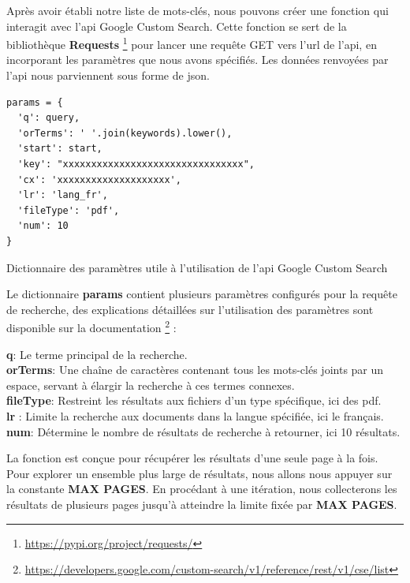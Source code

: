 Après avoir établi notre liste de mots-clés, nous pouvons créer une fonction qui interagit avec l'\ac{api} Google Custom Search. Cette fonction se sert de la bibliothèque \textbf{Requests} \footnote{\href{https://pypi.org/project/requests/}{https://pypi.org/project/requests/}} pour lancer une requête GET vers l'\acs{url} de l'\acs{api}, en incorporant les paramètres que nous avons spécifiés. Les données renvoyées par l'\acs{api} nous parviennent sous forme de \ac{json}.

\begin{listing}[!ht]
\begin{verbatim}
params = {
  'q': query,
  'orTerms': ' '.join(keywords).lower(),
  'start': start,
  'key': "xxxxxxxxxxxxxxxxxxxxxxxxxxxxxxxx",
  'cx': 'xxxxxxxxxxxxxxxxxxxx',
  'lr': 'lang_fr',
  'fileType': 'pdf',
  'num': 10
}
\end{verbatim}
\caption{Dictionnaire des paramètres utile à l'utilisation de l'\acs{api} Google Custom Search}
\label{appendix:code:python:search-google-params}
\end{listing}

Le dictionnaire \textbf{params} contient plusieurs paramètres configurés pour la requête de recherche, des explications détaillées sur l'utilisation des paramètres sont disponible sur la documentation \footnote{\href{https://developers.google.com/custom-search/v1/reference/rest/v1/cse/list}{https://developers.google.com/custom-search/v1/reference/rest/v1/cse/list}} :

\textbf{q}: Le terme principal de la recherche. \\
\textbf{orTerms}: Une chaîne de caractères contenant tous les mots-clés joints par un espace, servant à élargir la recherche à ces termes connexes. \\
\textbf{fileType}: Restreint les résultats aux fichiers d'un type spécifique, ici des \acs{pdf}. \\
\textbf{lr} : Limite la recherche aux documents dans la langue spécifiée, ici le français. \\
\textbf{num}: Détermine le nombre de résultats de recherche à retourner, ici 10 résultats.

La fonction est conçue pour récupérer les résultats d'une seule page à la fois. Pour explorer un ensemble plus large de résultats, nous allons nous appuyer sur la constante \textbf{MAX PAGES}. En procédant à une itération, nous collecterons les résultats de plusieurs pages jusqu'à atteindre la limite fixée par \textbf{MAX PAGES}.

